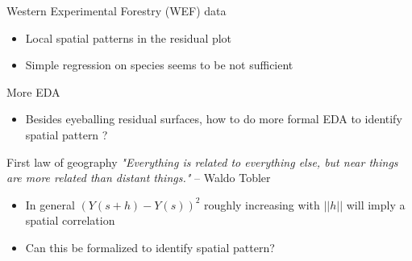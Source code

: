 \documentclass[xcolor=pdftex,dvipsnames,table,numbers,hyperref={pdfpagelabels=false},compress]{beamer}
\newcommand{\red}[1]{{\color{Red} #1}}
\begin{document}
\begin{frame}{Western Experimental Forestry (WEF) data}
\begin{figure}
\begin{center}
	\end{center}
\end{figure}
\pause
\begin{itemize}
	\item \red{Local spatial patterns} in the residual plot
	\item Simple regression on species seems to be \red{not sufficient}
\end{itemize}
\end{frame}



\begin{frame}{More EDA}
	\begin{itemize}
		\item Besides eyeballing residual surfaces, how to do more formal EDA to identify spatial pattern ?
	\end{itemize}
	\pause
      \begin{exampleblock}{First law of geography}
{\em "Everything is related to everything else, but \red{near things are more related} than distant things."} -- Waldo Tobler
		\end{exampleblock}
	
	\pause
	\begin{itemize}
		\item In general $(Y(s+h)-Y(s))^2$ roughly increasing with $||h||$ will imply a spatial correlation
		\item Can this be formalized to identify spatial pattern?
	\end{itemize}
\end{frame}
\end{document}
